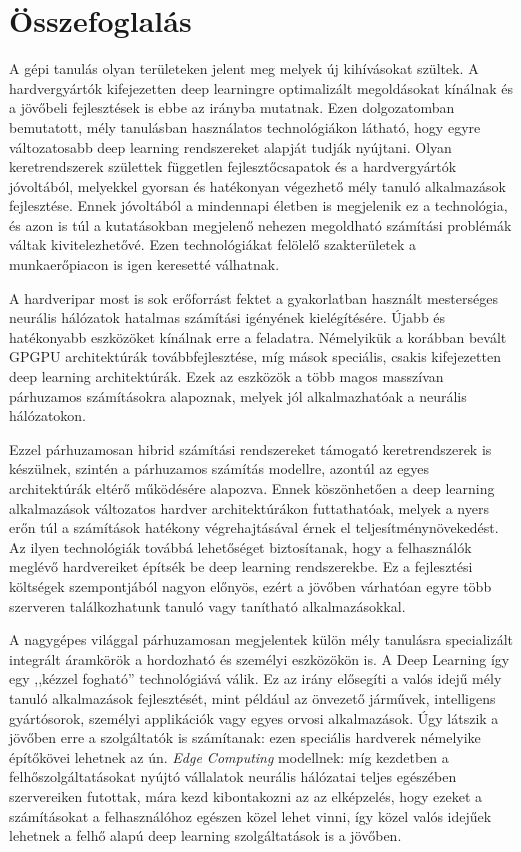 \chapter*{Összefoglalás}
A gépi tanulás olyan területeken jelent meg melyek új kihívásokat szültek. A hardvergyártók kifejezetten deep learningre optimalizált megoldásokat kínálnak és a jövőbeli fejlesztések is ebbe az irányba mutatnak. Ezen dolgozatomban bemutatott, mély tanulásban használatos technológiákon látható, hogy egyre változatosabb deep learning rendszereket alapját tudják nyújtani. Olyan keretrendszerek születtek független fejlesztőcsapatok és a hardvergyártók jóvoltából, melyekkel gyorsan és hatékonyan végezhető mély tanuló alkalmazások fejlesztése. Ennek jóvoltából a mindennapi életben is megjelenik ez a technológia, és azon is túl a kutatásokban megjelenő nehezen megoldható számítási problémák váltak kivitelezhetővé. Ezen technológiákat felölelő szakterületek a munkaerőpiacon is igen keresetté válhatnak.

A hardveripar most is sok erőforrást fektet a gyakorlatban használt mesterséges neurális hálózatok hatalmas számítási igényének kielégítésére. Újabb és hatékonyabb eszközöket kínálnak erre a feladatra. Némelyikük a korábban bevált GPGPU architektúrák továbbfejlesztése, míg mások speciális, csakis kifejezetten deep learning architektúrák. Ezek az eszközök a több magos masszívan párhuzamos számításokra alapoznak, melyek jól alkalmazhatóak a neurális hálózatokon.

Ezzel párhuzamosan hibrid számítási rendszereket támogató keretrendszerek is készülnek, szintén a párhuzamos számítás modellre, azontúl az egyes architektúrák eltérő működésére alapozva. Ennek köszönhetően a deep learning alkalmazások változatos hardver architektúrákon futtathatóak, melyek a nyers erőn túl a számítások hatékony végrehajtásával érnek el teljesítménynövekedést. Az ilyen technológiák továbbá lehetőséget biztosítanak, hogy a felhasználók meglévő hardvereiket építsék be deep learning rendszerekbe. Ez a fejlesztési költségek szempontjából nagyon előnyös, ezért a jövőben várhatóan egyre több szerveren találkozhatunk tanuló vagy tanítható alkalmazásokkal.

A nagygépes világgal párhuzamosan megjelentek külön mély tanulásra specializált integrált áramkörök a hordozható és személyi eszközökön is. A Deep Learning így egy ,,kézzel fogható'' technológiává válik. Ez az irány elősegíti a valós idejű mély tanuló alkalmazások fejlesztését, mint például az önvezető járművek, intelligens gyártósorok, személyi applikációk vagy egyes orvosi alkalmazások. Úgy látszik a jövőben erre a szolgáltatók is számítanak: ezen speciális hardverek némelyike építőkövei lehetnek az ún. \emph{Edge Computing} modellnek: míg kezdetben a felhőszolgáltatásokat nyújtó vállalatok neurális hálózatai teljes egészében szervereiken futottak, mára kezd kibontakozni az az elképzelés, hogy ezeket a számításokat a felhasználóhoz egészen közel lehet vinni, így közel valós idejűek lehetnek a felhő alapú deep learning szolgáltatások is a jövőben.

